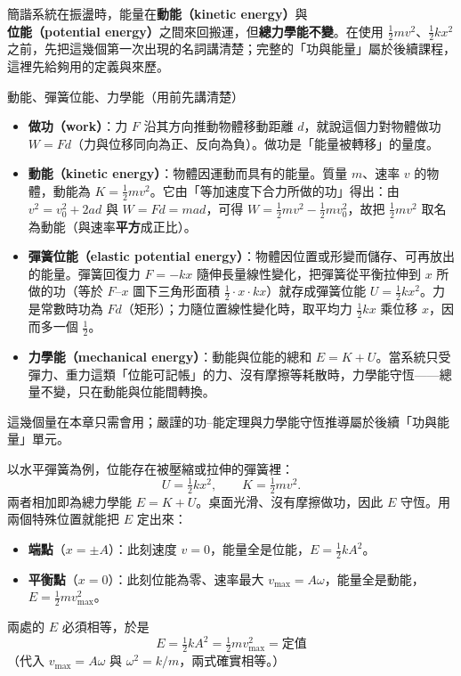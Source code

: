 \documentclass[11pt]{article}
\begin{document}
簡諧系統在振盪時，能量在\textbf{動能（kinetic energy）}與\textbf{位能（potential energy）}之間來回搬運，但\textbf{總力學能不變}。在使用 $\tfrac12 mv^2$、$\tfrac12 kx^2$ 之前，先把這幾個第一次出現的名詞講清楚；完整的「功與能量」屬於後續課程，這裡先給夠用的定義與來歷。

\begin{補充框}{動能、彈簧位能、力學能（用前先講清楚）}
\begin{itemize}\setlength{\itemsep}{2pt}
\item \textbf{做功（work）}：力 $F$ 沿其方向推動物體移動距離 $d$，就說這個力對物體做功 $W=Fd$（力與位移同向為正、反向為負）。做功是「能量被轉移」的量度。
\item \textbf{動能（kinetic energy）}：物體因運動而具有的能量。質量 $m$、速率 $v$ 的物體，動能為 $K=\tfrac12 mv^2$。它由「等加速度下合力所做的功」得出：由 $v^2=v_0^2+2ad$ 與 $W=Fd=mad$，可得 $W=\tfrac12 mv^2-\tfrac12 mv_0^2$，故把 $\tfrac12 mv^2$ 取名為動能（與速率\textbf{平方}成正比）。
\item \textbf{彈簧位能（elastic potential energy）}：物體因位置或形變而儲存、可再放出的能量。彈簧回復力 $F=-kx$ 隨伸長量線性變化，把彈簧從平衡拉伸到 $x$ 所做的功（等於 $F$–$x$ 圖下三角形面積 $\tfrac12\cdot x\cdot kx$）就存成彈簧位能 $U=\tfrac12 kx^2$。力是常數時功為 $Fd$（矩形）；力隨位置線性變化時，取平均力 $\tfrac12 kx$ 乘位移 $x$，因而多一個 $\tfrac12$。
\item \textbf{力學能（mechanical energy）}：動能與位能的總和 $E=K+U$。當系統只受彈力、重力這類「位能可記帳」的力、沒有摩擦等耗散時，力學能守恆——總量不變，只在動能與位能間轉換。
\end{itemize}
這幾個量在本章只需會用；嚴謹的功–能定理與力學能守恆推導屬於後續「功與能量」單元。
\end{補充框}

以水平彈簧為例，位能存在被壓縮或拉伸的彈簧裡：
$$U=\tfrac12 kx^2,\qquad K=\tfrac12 mv^2.$$
兩者相加即為總力學能 $E=K+U$。桌面光滑、沒有摩擦做功，因此 $E$ 守恆。用兩個特殊位置就能把 $E$ 定出來：

\begin{itemize}\setlength{\itemsep}{1pt}
\item \textbf{端點}（$x=\pm A$）：此刻速度 $v=0$，能量全是位能，$E=\tfrac12 kA^2$。
\item \textbf{平衡點}（$x=0$）：此刻位能為零、速率最大 $v_{\max}=A\omega$，能量全是動能，$E=\tfrac12 m v_{\max}^2$。
\end{itemize}

兩處的 $E$ 必須相等，於是
$$\boxed{\;E=\tfrac12 kA^2=\tfrac12 m v_{\max}^2=\text{定值}\;}$$
（代入 $v_{\max}=A\omega$ 與 $\omega^2=k/m$，兩式確實相等。）
\end{document}
